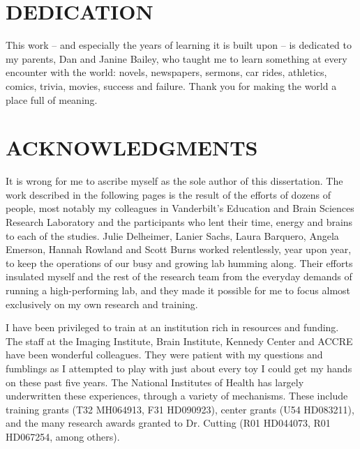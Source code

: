 \documentclass[12pt]{report}  %
\begin{document}
\doublespacing
{} \setcounter{page}{2}

\chapter*{DEDICATION}
\vspace{7mm}

This work -- and especially the years of learning it is built upon -- is dedicated to my parents, Dan and Janine Bailey, who taught me to learn something at every encounter with the world: novels, newspapers, sermons, car rides, athletics, comics, trivia, movies, success and failure. Thank you for making the world a place full of meaning.

\chapter*{ACKNOWLEDGMENTS}
\vspace{7mm}

It is wrong for me to ascribe myself as the sole author of this dissertation. The work described in the following pages is the result of the efforts of dozens of people, most notably my colleagues in Vanderbilt's Education and Brain Sciences Research Laboratory and the participants who lent their time, energy and brains to each of the studies. Julie Delheimer, Lanier Sachs, Laura Barquero, Angela Emerson, Hannah Rowland and Scott Burns worked relentlessly, year upon year, to keep the operations of our busy and growing lab humming along. Their efforts insulated myself and the rest of the research team from the everyday demands of running a high-performing lab, and they made it possible for me to focus almost exclusively on my own research and training. 

I have been privileged to train at an institution rich in resources and funding. The staff at the Imaging Institute, Brain Institute, Kennedy Center and ACCRE have been wonderful colleagues. They were patient with my questions and fumblings as I attempted to play with just about every toy I could get my hands on these past five years. The National Institutes of Health has largely underwritten these experiences, through a variety of mechanisms. These include training grants (T32 MH064913, F31 HD090923), center grants (U54 HD083211), and the many research awards granted to Dr. Cutting (R01 HD044073, R01 HD067254, among others).
\end{document}
